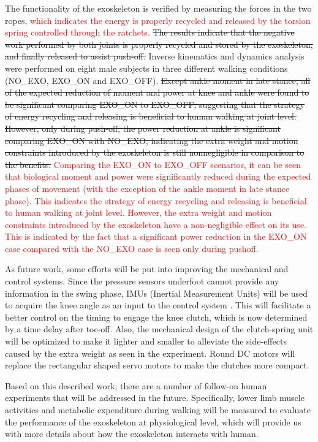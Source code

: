 \documentclass[twocolumn,cleanfoot,10pt]{asme2ej}
\begin{document}
The functionality of the exoskeleton is verified by measuring the forces in the two ropes, \textcolor{red}{which indicates the energy is properly recycled and released by the torsion spring controlled through the ratchets.}
\sout{The results indicate that the negative work performed by both joints is properly recycled and stored by the exoskeleton, and finally released to assist push-off.}
Inverse kinematics and dynamics analysis were performed on eight male subjects in three different walking conditions (NO\_EXO, EXO\_ON and EXO\_OFF).
\sout{Except ankle moment in late stance, all of the expected reduction of moment and power at knee and ankle were found to be significant comparing EXO\_ON to EXO\_OFF, suggesting that the strategy of energy recycling and releasing is beneficial to human walking at joint level. However, only during push-off, the power reduction at ankle is significant comparing EXO\_ON with NO\_EXO, indicating the extra weight and motion constraints introduced by the exoskeleton is still nonnegligible in comparison to the benefits.}
\textcolor{red}{Comparing the EXO\_ON to EXO\_OFF scenarios, it can be seen that biological moment and power were significantly reduced during the expected phases of movement (with the exception of the ankle moment in late stance phase).
This indicates the strategy of energy recycling and releasing is beneficial to human walking at joint level.
However, the extra weight and motion constraints introduced by the exoskeleton have a non-negligible effect on its use.
This is indicated by the fact that a significant power reduction in the EXO\_ON case compared with the NO\_EXO case is seen only during pushoff.}

As future work, some efforts will be put into improving the mechanical and control systems.
Since the pressure sensors underfoot cannot provide any information in the swing phase, IMUs (Inertial Measurement Units) will be used to acquire the knee angle as an input to the control system \cite{IMU2}.
This will facilitate a better control on the timing to engage the knee clutch, which is now determined by a time delay after toe-off.
Also, the mechanical design of the clutch-spring unit will be optimized to make it lighter and smaller to alleviate the side-effects caused by the extra weight as seen in the experiment.
Round DC motors will replace the rectangular shaped servo motors to make the clutches more compact. 

Based on this described work, there are a number of follow-on human experiments that will be addressed in the future.
Specifically, lower limb muscle activities and metabolic expenditure during walking will be measured to evaluate the performance of the exoskeleton at physiological level, which will provide us with more details about how the exoskeleton interacts with human.
\end{document}
